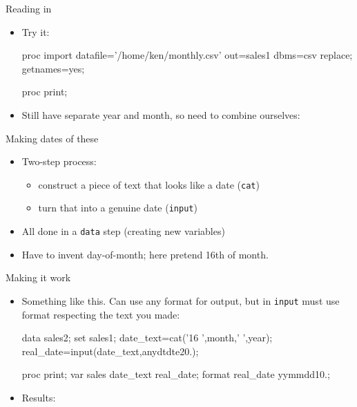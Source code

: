 \documentclass[unknownkeysallowed]{beamer}\usepackage[]{graphicx}\usepackage[]{color}
\begin{document}
\begin{frame}[fragile]{Reading in}
  \begin{itemize}
    
    \item Try it:
    
    \begin{Sascode}[store=jahaq]
proc import
  datafile='/home/ken/monthly.csv'
  out=sales1
  dbms=csv
  replace;
  getnames=yes;
  
proc print;  
    \end{Sascode}

  \item Still have separate year and month, so need to combine ourselves:

    
  \end{itemize}
\end{frame}

\begin{frame}[fragile]{Making dates of these}
  
  \begin{itemize}
  \item Two-step process:
    \begin{itemize}
    \item construct a piece of text that looks like a date (\texttt{cat})
    \item turn that into a genuine date (\texttt{input})
    \end{itemize}
  \item All done in a \texttt{data} step (creating new variables)
  \item Have to invent day-of-month; here pretend 16th of month.
  \end{itemize}
  
\end{frame}

\begin{frame}[fragile]{Making it work}
  \begin{itemize}
  \item Something like this. Can use any format for output, but in
    \texttt{input} must use format respecting the text you made:
    
    \begin{small}
    \begin{Sascode}[store=nubiv]
data sales2;
  set sales1;
  date_text=cat('16 ',month,' ',year);
  real_date=input(date_text,anydtdte20.);
  
proc print;  
  var sales date_text real_date;
  format real_date yymmdd10.;
    \end{Sascode}
      
    \end{small}
    
    \item Results:
      
  \end{itemize}
\end{frame}
\end{document}
